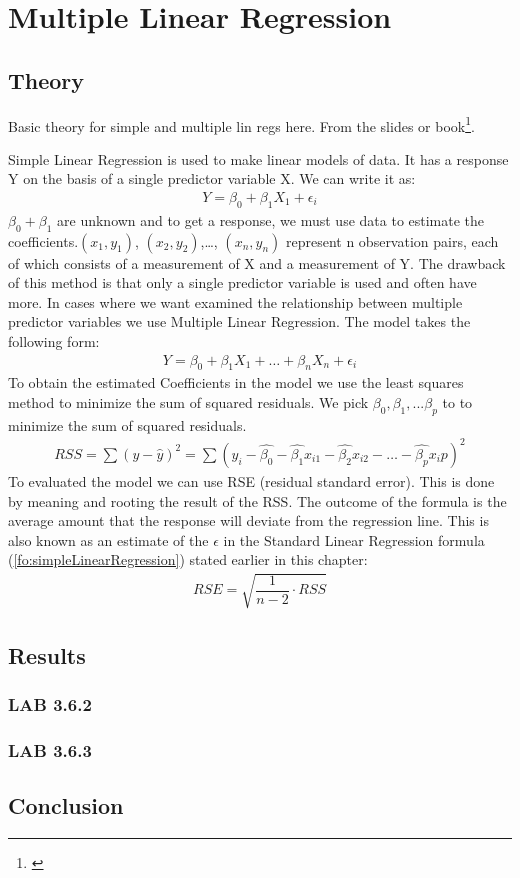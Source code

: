 \section{Multiple Linear Regression}\label{sc:multipleLinearRegression}

\subsection{Theory}

Basic theory for simple and multiple lin regs here. From the slides or book\footnote{\cite{James2013}}.

Simple Linear Regression is used to make linear models of data. It has a response Y on the basis of a single predictor variable X. We can write it as:
\begin{align}\label{fo:simpleLinearRegression}
Y = \beta_0 + \beta_1 X_1 + \epsilon_i
\end{align}
$ \beta_0 + \beta_1 $ are unknown and to get a response, we must use data to estimate the coefficients.$(x_1, y_1)$, $(x_2, y_2)$,\ldots, $(x_n, y_n)$ represent n observation pairs, each of which consists of a measurement of X and a measurement of Y. The drawback of this method is that only a single predictor variable is used and often have more.
 In cases where we want examined the relationship between multiple predictor variables we use Multiple Linear Regression. The model takes the following form:
\begin{align}\label{fo:multipleLinearRegression}
Y = \beta_0 + \beta_1 X_1 + \ldots + \beta_n X_n + \epsilon_i
\end{align}
To obtain the estimated Coefficients in the model we use the least squares method to minimize the sum of squared residuals. We pick $\beta_0, \beta_1, ... \beta_p$ to to minimize the sum of squared residuals.
\begin{align}\label{fo:rss}
RSS = \sum (y - \hat{y})^2 = \sum( y_i - \hat{\beta_0} - \hat{\beta_1}x_{i1} - \hat{\beta_2}x_{i2} - \ldots - \hat{\beta_p}x_\textit{i}p )^2
\end{align}
To evaluated the model we can use RSE (residual standard error). This is done by meaning and rooting the result of the RSS. The outcome of the formula is the average amount that the response will deviate from the regression line. This is also known as an estimate of the $\epsilon$ in the Standard Linear Regression formula (\ref{fo:simpleLinearRegression}) stated earlier in this chapter:
\begin{align}\label{fo:rse}
RSE = \sqrt{\dfrac{1}{n-2}\cdot RSS}
\end{align}


\subsection{Results}

\subsubsection*{LAB 3.6.2}

\subsubsection*{LAB 3.6.3}

\subsection{Conclusion}